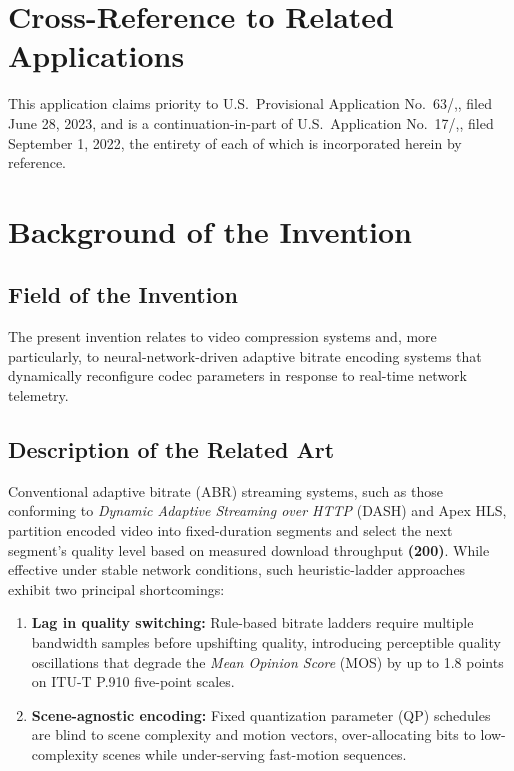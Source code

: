 \documentclass[12pt,letterpaper]{article}
\newcommand{\refnum}[1]{\textbf{(#1)}}
\newcommand{\defterm}[1]{\textit{#1}}
\begin{document}
\section{Cross-Reference to Related Applications}\label{sec:crossref}

This application claims priority to U.S.\ Provisional Application No.\ 63/,,
filed June 28, 2023, and is a continuation-in-part of U.S.\ Application No.\
17/,, filed September 1, 2022, the entirety of each of which is incorporated
herein by reference.

\section{Background of the Invention}\label{sec:background}

\subsection{Field of the Invention}

The present invention relates to video compression systems and, more particularly, to
neural-network-driven adaptive bitrate encoding systems that dynamically reconfigure
codec parameters in response to real-time network telemetry.

\subsection{Description of the Related Art}

Conventional adaptive bitrate (ABR) streaming systems, such as those conforming to
\defterm{Dynamic Adaptive Streaming over HTTP} (DASH) and Apex HLS, partition encoded
video into fixed-duration segments and select the next segment's quality level based on
measured download throughput \refnum{200}. While effective under stable network
conditions, such heuristic-ladder approaches exhibit two principal shortcomings:

\begin{enumerate}[label=(\roman*), leftmargin=2em, itemsep=2pt]
  \item \textbf{Lag in quality switching:} Rule-based bitrate ladders require multiple
    bandwidth samples before upshifting quality, introducing perceptible quality
    oscillations that degrade the \defterm{Mean Opinion Score} (MOS) by up to 1.8 points
    on ITU-T P.910 five-point scales.
  \item \textbf{Scene-agnostic encoding:} Fixed quantization parameter (QP) schedules
    are blind to scene complexity and motion vectors, over-allocating bits to
    low-complexity scenes while under-serving fast-motion sequences.
\end{enumerate}
\end{document}
